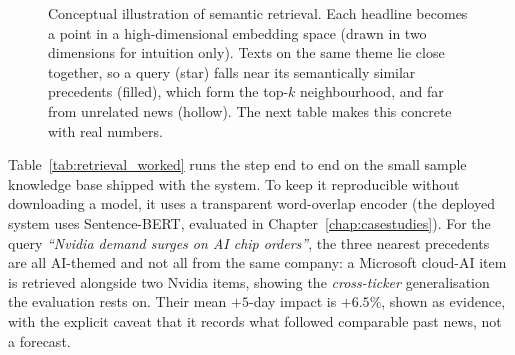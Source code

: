 \begin{figure}[ht]
\centering
{}
\caption[Conceptual illustration of semantic retrieval]{Conceptual illustration of semantic retrieval.
Each headline becomes a point in a high-dimensional embedding space (drawn in two dimensions for intuition
only). Texts on the same theme lie close together, so a query (star) falls near its semantically similar
precedents (filled), which form the top-$k$ neighbourhood, and far from unrelated news (hollow). The next
table makes this concrete with real numbers.}
\label{fig:embedding_concept}
\end{figure}

Table~\ref{tab:retrieval_worked} runs the step end to end on the small sample knowledge base shipped with
the system. To keep it reproducible without downloading a model, it uses a transparent word-overlap encoder
(the deployed system uses Sentence-BERT, evaluated in Chapter~\ref{chap:casestudies}). For the query
\emph{``Nvidia demand surges on AI chip orders''}, the three nearest precedents are all AI-themed and not
all from the same company: a Microsoft cloud-AI item is retrieved alongside two Nvidia items, showing the
\emph{cross-ticker} generalisation the evaluation rests on. Their mean $+5$-day impact is $+6.5\%$, shown
as evidence, with the explicit caveat that it records what followed comparable past news, not a forecast.

